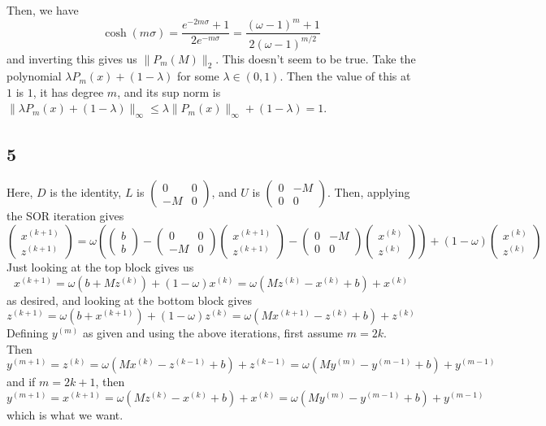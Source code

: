 \documentclass{article}
\newcommand{\openm}{\begin{pmatrix}}
\newcommand{\closem}{\end{pmatrix}}
\begin{document}
Then, we have
\[\cosh(m\sigma)=\frac{e^{-2m\sigma}+1}{2e^{-m\sigma}}=\frac{(\omega-1)^m+1}{2(\omega-1)^{m/2}}\]
and inverting this gives us $\|P_m(M)\|_2$.
This doesn't seem to be true. Take the polynomial $\lambda P_m(x)+(1-\lambda)$ for some $\lambda\in(0,1)$. Then the value of this at $1$ is $1$, it has degree $m$, and its sup norm is $\|\lambda P_m(x)+(1-\lambda)\|_\infty\leq\lambda\|P_m(x)\|_\infty+(1-\lambda)=1$.
\subsection*{5}
Here, $D$ is the identity, $L$ is $\openm0&0\\-M&0\closem$, and $U$ is $\openm0&-M\\0&0\closem$. Then, applying the SOR iteration gives
\[\openm x^{(k+1)}\\z^{(k+1)}\closem=\omega\left(\openm b\\b\closem-\openm0&0\\-M&0\closem\openm x^{(k+1)}\\z^{(k+1)}\closem-\openm0&-M\\0&0\closem\openm x^{(k)}\\z^{(k)}\closem\right)+(1-\omega)\openm x^{(k)}\\z^{(k)}\closem\]
Just looking at the top block gives us
\[x^{(k+1)}=\omega(b+Mz^{(k)})+(1-\omega)x^{(k)}=\omega(Mz^{(k)}-x^{(k)}+b)+x^{(k)}\]
as desired, and looking at the bottom block gives
\[z^{(k+1)}=\omega(b+x^{(k+1)})+(1-\omega)z^{(k)}=\omega(Mx^{(k+1)}-z^{(k)}+b)+z^{(k)}\]
Defining $y^{(m)}$ as given and using the above iterations, first assume $m=2k$. Then
\[y^{(m+1)}=z^{(k)}=\omega(Mx^{(k)}-z^{(k-1)}+b)+z^{(k-1)}=\omega(My^{(m)}-y^{(m-1)}+b)+y^{(m-1)}\]
and if $m=2k+1$, then
\[y^{(m+1)}=x^{(k+1)}=\omega(Mz^{(k)}-x^{(k)}+b)+x^{(k)}=\omega(My^{(m)}-y^{(m-1)}+b)+y^{(m-1)}\]
which is what we want.
\end{document}
